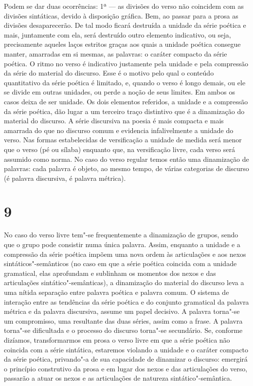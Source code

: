 Podem se dar duas ocorrências: 1ª --- as divisões do verso não coincidem
com as divisões sintáticas, devido à disposição gráfica. Bem, ao passar
para a prosa as divisões desaparecerão. De tal modo ficará destruída a
unidade da série poética e mais, juntamente com ela, será destruído
outro elemento indicativo, ou seja, precisamente aqueles laços estritos
graças aos quais a unidade poética consegue manter, amarradas em si
mesmas, as palavras: o caráter compacto da série poética. O ritmo no
verso é indicativo justamente pela unidade e pela compressão da série
do material do discurso. Esse é o motivo pelo qual o conteúdo
quantitativo da série poética é limitado, e, quando o verso é longo
demais, ou ele se divide em outras unidades, ou perde a noção de seus
limites. Em ambos os casos deixa de ser unidade. Os dois elementos
referidos, a unidade e a compressão da série poética, dão lugar a um
terceiro traço distintivo que é a dinamização do material do discurso. A
série discursiva na poesia é mais compacta e mais amarrada do que no
discurso comum e evidencia infalivelmente a unidade do verso. Nas formas
estabelecidas de versificação a unidade de medida será menor que o verso
(pé ou sílaba) enquanto que, na versificação livre, cada verso será
assumido como norma. No caso do verso regular temos então uma
dinamização de palavras: cada palavra é objeto, ao mesmo tempo, de
várias categorias de discurso (é palavra discursiva, é palavra métrica).

\section{9}

No caso do verso livre tem"-se frequentemente a dinamização de grupos,
sendo que o grupo pode consistir numa única palavra. Assim, enquanto a
unidade e a compressão da série poética impõem uma nova ordem às
articulações e aos nexos sintáticos"-semânticos (no caso em que a
série poética coincida com a unidade gramatical, elas aprofundam e
sublinham os momentos dos nexos e das articulações sintático"-semânticas), a dinamização do material do discurso leva a uma nítida
separação entre palavra poética e palavra comum. O sistema de interação
entre as tendências da série poética e do conjunto gramatical da palavra
métrica e da palavra discursiva, assume um papel decisivo. A palavra
torna"-se um compromisso, uma resultante das duas séries, assim como a
frase. A palavra torna"-se dificultada e o processo do discurso torna"-se
secundário. Se, conforme dizíamos, transformarmos em prosa o verso livre
em que a série poética não coincida com a série sintática, estaremos
violando a unidade e o caráter compacto da série poética, privando"-a de
sua capacidade de dinamizar o discurso: emergirá o princípio construtivo
da prosa e em lugar dos nexos e das articulações do verso, passarão a
atuar os nexos e as articulações de natureza sintático"-semântica.

